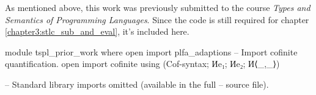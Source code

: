 As mentioned above, this work was previously submitted to the course \textit{Types and Semantics of
Programming Languages}. Since the code is still required for chapter
\ref{chapter3:stlc_sub_and_eval}, it's included here.

\begin{code}
module tspl_prior_work where
  open import plfa_adaptions
  -- Import cofinite quantification.
  open import cofinite using (Cof-syntax; Иe₁; Иe₂; И⟨_,_⟩) 

  -- Standard library imports omitted (available in the full
  -- source file).
\end{code}
\begin{comment}
  \begin{code}
  -- Data types (naturals, strings, characters)
  open import Data.Nat using (ℕ; zero; suc; _<_; _≥_; _≤_; _≤?_; _<?_; z≤n; s≤s; _⊔_)
    renaming (_≟_ to _≟ℕ_)
  open import Data.Nat.Properties using (≤-refl; ≤-trans; ≤-<-trans; <-≤-trans; ≤-antisym; ≤-total;
    +-mono-≤; n≤1+n; m≤n⇒m≤1+n; suc-injective; <⇒≢; ≰⇒>; ≮⇒≥)
  open import Data.String using (String; fromList; toList) renaming (_≟_ to _≟str_;
    _++_ to _++str_; length to str-length)
  open import Data.Char using (Char)
  open import Data.Char.Properties using () renaming (_≟_ to _≟char_)
  
  -- Function manipulation.
  open import Function using (_∘_; flip; it; id; case_returning_of_)
  
  -- Relations and predicates/decidability.
  import Relation.Binary.PropositionalEquality as Eq
  open Eq using (_≡_; _≢_; refl; sym; trans; cong; cong-app; cong₂)
  open Eq.≡-Reasoning using (begin_; step-≡-∣; step-≡-⟩; _∎)
  open import Relation.Binary.Definitions using (DecidableEquality)
  open import Relation.Nullary.Decidable using (Dec; yes; no; True; False; toWitnessFalse;
    toWitness; fromWitness; ¬?; ⌊_⌋; From-yes)
  open import Relation.Unary using (Decidable)
  open import Relation.Binary using () renaming (Decidable to BinaryDecidable)
  open import Relation.Nullary.Negation using (¬_; contradiction)
  open import Data.Empty using (⊥-elim)
  
  -- Products and exists quantifier.
  open import Data.Product using (_×_; proj₁; proj₂; ∃-syntax) renaming (_,_ to ⟨_,_⟩)
  
  -- Lists.
  open import Data.List using (List; []; _∷_; _++_; length; filter; map; foldr; head; replicate)
  open import Data.List.Properties using (≡-dec)
  import Data.List.Membership.DecPropositional as DecPropMembership
  open import Data.List.Relation.Unary.All using (All; all?; lookup)
    renaming (fromList to All-fromList; toList to All-toList)
  open import Data.List.Relation.Unary.Any using (Any; here; there)
  open import Data.List.Extrema Data.Nat.Properties.≤-totalOrder using (max; xs≤max)
  

\end{comment}
